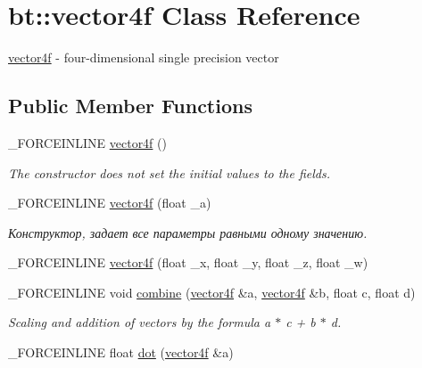 \hypertarget{classbt_1_1vector4f}{\section{bt\-:\-:vector4f Class Reference}
\label{classbt_1_1vector4f}
}


\hyperlink{classbt_1_1vector4f}{vector4f} -\/ four-\/dimensional single precision vector  


\subsection*{Public Member Functions}
\begin{DoxyCompactItemize}
\item 
\hypertarget{classbt_1_1vector4f_a566888021afc975cf148c5a8bf877ead}{\-\_\-\-F\-O\-R\-C\-E\-I\-N\-L\-I\-N\-E \hyperlink{classbt_1_1vector4f_a566888021afc975cf148c5a8bf877ead}{vector4f} ()}\label{classbt_1_1vector4f_a566888021afc975cf148c5a8bf877ead}

\begin{DoxyCompactList}\small\item\em The constructor does not set the initial values to the fields. \end{DoxyCompactList}\item 
\hypertarget{classbt_1_1vector4f_a0cf3db964ec50302e49a326eec780e4f}{\-\_\-\-F\-O\-R\-C\-E\-I\-N\-L\-I\-N\-E \hyperlink{classbt_1_1vector4f_a0cf3db964ec50302e49a326eec780e4f}{vector4f} (float \-\_\-a)}\label{classbt_1_1vector4f_a0cf3db964ec50302e49a326eec780e4f}

\begin{DoxyCompactList}\small\item\em Конструктор, задает все параметры равными одному значению. \end{DoxyCompactList}\item 
\-\_\-\-F\-O\-R\-C\-E\-I\-N\-L\-I\-N\-E \hyperlink{classbt_1_1vector4f_a866b314b6b6becb6bde06f92f61da2e3}{vector4f} (float \-\_\-x, float \-\_\-y, float \-\_\-z, float \-\_\-w)
\item 
\hypertarget{classbt_1_1vector4f_a1c3fd0b78ef9d73a3737d67d812f56d3}{\-\_\-\-F\-O\-R\-C\-E\-I\-N\-L\-I\-N\-E void \hyperlink{classbt_1_1vector4f_a1c3fd0b78ef9d73a3737d67d812f56d3}{combine} (\hyperlink{classbt_1_1vector4f}{vector4f} \&a, \hyperlink{classbt_1_1vector4f}{vector4f} \&b, float c, float d)}\label{classbt_1_1vector4f_a1c3fd0b78ef9d73a3737d67d812f56d3}

\begin{DoxyCompactList}\small\item\em Scaling and addition of vectors by the formula a $\ast$ c + b $\ast$ d. \end{DoxyCompactList}\item 
\hypertarget{classbt_1_1vector4f_adcacf21297cedf5a8e596c35b1c29ee9}{\-\_\-\-F\-O\-R\-C\-E\-I\-N\-L\-I\-N\-E float \hyperlink{classbt_1_1vector4f_adcacf21297cedf5a8e596c35b1c29ee9}{dot} (\hyperlink{classbt_1_1vector4f}{vector4f} \&a)}\label{classbt_1_1vector4f_adcacf21297cedf5a8e596c35b1c29ee9}


\end{DoxyCompactItemize}
